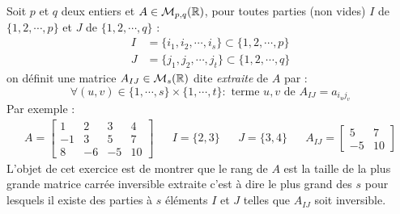 Soit $p$ et $q$ deux entiers et $A\in \mathcal M_{p,q}(\mathbb{R})$, pour toutes parties (non vides) $I$ de $\{1,2,\cdots,p\}$ et $J$ de $\{1,2,\cdots,q\}$ :
\begin{align*}
 I &= \{i_1,i_2,\cdots,i_s\}\subset \{1,2,\cdots,p\} \\
 J &= \{j_1,j_2,\cdots,j_t\}\subset \{1,2,\cdots,q\} 
\end{align*}
on définit une matrice $A_{IJ}\in \mathcal M_{s}(\mathbb{R})$ dite \emph{extraite} de $A$ par :
\begin{displaymath}
 \forall (u,v)\in \{1,\cdots, s\}\times \{1,\cdots, t\} :\text{ terme $u,v$ de }A_{IJ} 
= a_{i_uj_v} 
\end{displaymath}
Par exemple :
\begin{align*}
 A =
\begin{bmatrix}
 1 & 2 & 3 & 4 \\
 -1 & 3 & 5 & 7 \\
 8 & -6 & -5 & 10
\end{bmatrix}
& &
I=\{2,3\} & & J=\{3,4\} & &
A_{IJ}=
\begin{bmatrix}
 5 & 7 \\
 -5 & 10
\end{bmatrix}
\end{align*}
L'objet de cet exercice est de montrer que le rang de $A$ est la taille de la plus grande matrice carrée inversible extraite c'est à dire le plus grand des $s$ pour lesquels il existe des parties à $s$ éléments $I$ et $J$ telles que $A_{IJ}$ soit inversible.

